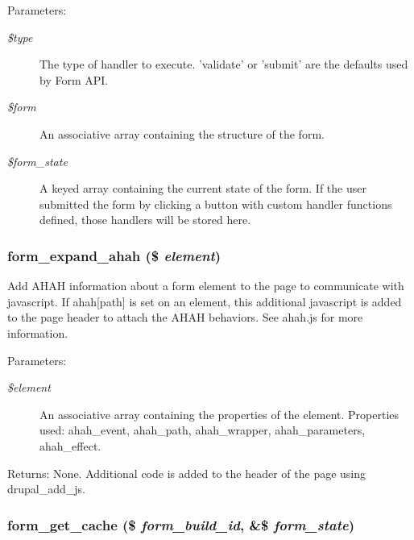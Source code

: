 \begin{Desc}
\item[Parameters:]
\begin{description}
\item[{\em \$type}]The type of handler to execute. 'validate' or 'submit' are the defaults used by Form API. \item[{\em \$form}]An associative array containing the structure of the form. \item[{\em \$form\_\-state}]A keyed array containing the current state of the form. If the user submitted the form by clicking a button with custom handler functions defined, those handlers will be stored here. \end{description}
\end{Desc}
\hypertarget{group__form__api_g0632ccaef8acafed177d8bc993ab9a47}{
\subsubsection[{form\_\-expand\_\-ahah}]{\setlength{\rightskip}{0pt plus 5cm}form\_\-expand\_\-ahah (\$ {\em element})}}
\label{group__form__api_g0632ccaef8acafed177d8bc993ab9a47}


Add AHAH information about a form element to the page to communicate with javascript. If ahah\mbox{[}path\mbox{]} is set on an element, this additional javascript is added to the page header to attach the AHAH behaviors. See ahah.js for more information.

\begin{Desc}
\item[Parameters:]
\begin{description}
\item[{\em \$element}]An associative array containing the properties of the element. Properties used: ahah\_\-event, ahah\_\-path, ahah\_\-wrapper, ahah\_\-parameters, ahah\_\-effect. \end{description}
\end{Desc}
\begin{Desc}
\item[Returns:]None. Additional code is added to the header of the page using drupal\_\-add\_\-js. \end{Desc}
\hypertarget{group__form__api_gb1da3001a3773a949188b52f61a9cd09}{
\subsubsection[{form\_\-get\_\-cache}]{\setlength{\rightskip}{0pt plus 5cm}form\_\-get\_\-cache (\$ {\em form\_\-build\_\-id}, \/  \&\$ {\em form\_\-state})}}
\label{group__form__api_gb1da3001a3773a949188b52f61a9cd09}


